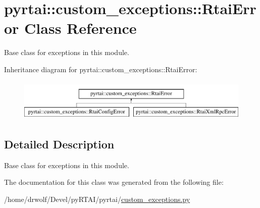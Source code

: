 \hypertarget{classpyrtai_1_1custom__exceptions_1_1_rtai_error}{
\section{pyrtai\-:\-:custom\-\_\-exceptions\-:\-:\-Rtai\-Error \-Class \-Reference}
\label{classpyrtai_1_1custom__exceptions_1_1_rtai_error}
}


\-Base class for exceptions in this module.  


\-Inheritance diagram for pyrtai\-:\-:custom\-\_\-exceptions\-:\-:\-Rtai\-Error\-:\begin{figure}[H]
\begin{center}
\leavevmode
\includegraphics[height=2.000000cm]{classpyrtai_1_1custom__exceptions_1_1_rtai_error}
\end{center}
\end{figure}


\subsection{\-Detailed \-Description}
\-Base class for exceptions in this module. 

\-The documentation for this class was generated from the following file\-:\begin{DoxyCompactItemize}
\item 
/home/drwolf/\-Devel/py\-R\-T\-A\-I/pyrtai/\hyperlink{custom__exceptions_8py}{custom\-\_\-exceptions.\-py}\end{DoxyCompactItemize}

